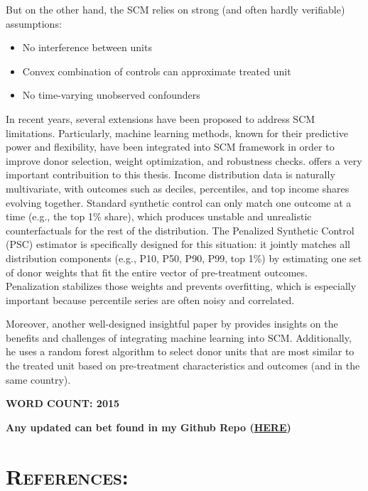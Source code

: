\documentclass[11pt,a4paper]{article}
\begin{document}
\par
But on the other hand, the SCM relies on strong (and often hardly verifiable) assumptions:
\begin{itemize}[leftmargin= 2cm]
    \item No interference between units 
    \item Convex combination of controls can approximate treated unit
    \item No time-varying unobserved confounders
\end{itemize}

\par
In recent years, several extensions have been proposed to address SCM limitations. 
Particularly, machine learning methods, known for their predictive power and flexibility, have been integrated into SCM framework in order to improve donor selection, weight optimization, and robustness checks.
\cite{abadie2023penalized} offers a very important contribuition to this thesis.
Income distribution data is naturally multivariate, with outcomes such as deciles, percentiles, and top income shares evolving together.
 Standard synthetic control can only match one outcome at a time (e.g., the top 1\% share), which produces unstable and unrealistic counterfactuals for the rest of the distribution. 
 The Penalized Synthetic Control (PSC) estimator is specifically designed for this situation: it jointly matches all distribution components (e.g., P10, P50, P90, P99, top 1\%) by estimating one set of donor weights that fit the entire vector of pre-treatment outcomes. 
 Penalization stabilizes those weights and prevents overfitting, which is especially important because percentile series are often noisy and correlated.

 \par
Moreover, another well-designed insightful paper by \cite{araujo2023synthetic} provides insights on the benefits and challenges of integrating machine learning into SCM.
Additionally, he uses a random forest algorithm to select donor units that are most similar to the treated unit based on pre-treatment characteristics and outcomes (and in the same country).

\medskip

\textbf{WORD COUNT: 2015}

\newpage
\vfill
\begin{center}
    \textbf{Any updated can bet found in my Github Repo (\href{https://github.com/LucasDubss/Master-Dubois-Lucas}{HERE})}
\end{center}
\vfill
\pagebreak

\section{\textsc{References:}}
\printbibliography[heading=none]
\end{document}
